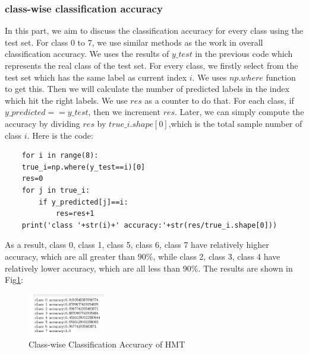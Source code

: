 \documentclass[conference]{IEEEtran}
\begin{document}
\subsubsection{class-wise classification accuracy}
In this part, we aim to discuss the classification accuracy for every class using the test set. 
For class $0$ to $7$, we use similar methods as the work in overall classification accuracy. 
We uses the results of $y\_test$ in the previous code which represents the real class of the test set. For every class, we firstly select from the test set which has the same label as current index $i$.
We uses $np.where$ function to get this. Then we will calculate the number of predicted labels in the index which hit the right labels. We use $res$ as a counter to do that.
For each class, if $y\_predicted == y\_test$, then we increment $res$.
Later, we can simply compute the accuracy by dividing $res$ by $true\_i.shape[0]$,which is the total sample number of class $i$.
Here is the code:
\begin{lstlisting}
    for i in range(8):
    true_i=np.where(y_test==i)[0]
    res=0
    for j in true_i:
        if y_predicted[j]==i:
            res=res+1
    print('class '+str(i)+' accuracy:'+str(res/true_i.shape[0]))
\end{lstlisting}
As a result, class 0, class 1, class 5, class 6, class 7 have relatively higher accuracy, which are all greater than $90\%$, while class 2, class 3, class 4 have relatively lower accuracy, which are all less than $90\%$.
The results are shown in Fig\ref{Fig.t3q2}:
\begin{figure}[h] 
    \centering
    \includegraphics[width=0.3\textwidth]{./graphs/T3Q1b.png}
    \caption{Class-wise Classification Accuracy of HMT} 
    \label{Fig.t3q2} 
\end{figure}
\end{document}
